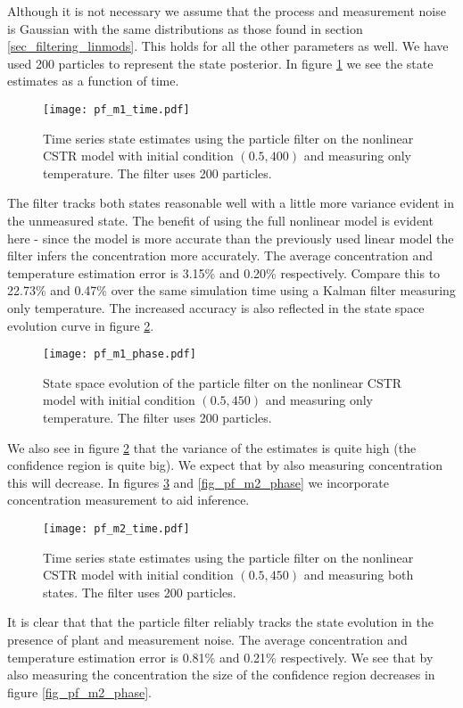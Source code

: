 Although it is not necessary we assume that the process and measurement noise is Gaussian with the same distributions as those found in section \ref{sec_filtering_linmods}. This holds for all the other parameters as well. We have used 200 particles to represent the state posterior. In figure \ref{fig_pf_m1_time} we see the state estimates as a function of time.
\begin{figure}[H] 
\centering
\texttt{[image: pf\_m1\_time.pdf]}
\caption{Time series state estimates using the particle filter on the nonlinear CSTR model with initial condition $(0.5, 400)$ and measuring only temperature. The filter uses 200 particles.}
\label{fig_pf_m1_time}
\end{figure}
The filter tracks both states reasonable well with a little more variance evident in the unmeasured state. The benefit of using the full nonlinear model is evident here - since the model is more accurate than the previously used linear model the filter infers the concentration more accurately. The average concentration and temperature estimation error is 3.15\% and 0.20\% respectively. Compare this to 22.73\% and 0.47\% over the same simulation time using a Kalman filter measuring only temperature. The increased accuracy is also reflected in the state space evolution curve in figure \ref{fig_pf_m1_phase}.
\begin{figure}[H] 
\centering
\texttt{[image: pf\_m1\_phase.pdf]}
\caption{State space evolution of the particle filter on the nonlinear CSTR model with initial condition $(0.5, 450)$ and measuring only temperature. The filter uses 200 particles.}
\label{fig_pf_m1_phase}
\end{figure}
We also see in figure \ref{fig_pf_m1_phase} that the variance of the estimates is quite high (the confidence region is quite big). We expect that by also measuring concentration this will decrease. In figures \ref{fig_pf_m2_time} and \ref{fig_pf_m2_phase} we incorporate concentration measurement to aid inference. 
\begin{figure}[H] 
\centering
\texttt{[image: pf\_m2\_time.pdf]}
\caption{Time series state estimates using the particle filter on the nonlinear CSTR model with initial condition $(0.5, 450)$ and measuring both states. The filter uses 200 particles.}
\label{fig_pf_m2_time}
\end{figure}
It is clear that that the particle filter reliably tracks the state evolution in the presence of plant and measurement noise. The average concentration and temperature estimation error is 0.81\% and 0.21\% respectively. We see that by also measuring the concentration the size of the confidence region decreases in figure \ref{fig_pf_m2_phase}. 
